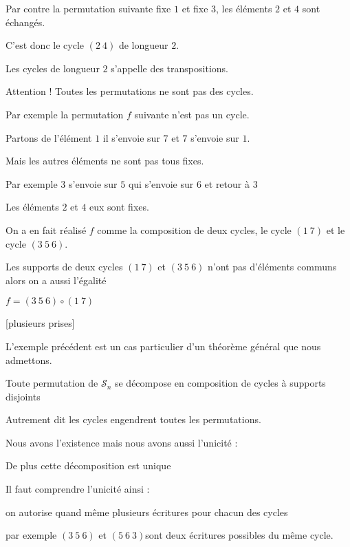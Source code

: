 \change

Par contre la permutation suivante 
fixe $1$ et fixe $3$, les éléments $2$ et $4$ sont échangés.

C'est donc le cycle $(2\ 4)$ de longueur $2$.

Les cycles de longueur $2$ s'appelle des transpositions.

\change

Attention ! Toutes les permutations ne sont pas des cycles. 

Par exemple la permutation $f$ suivante n'est pas un cycle.

Partons de l'élément $1$ il s'envoie sur $7$ et $7$ s'envoie sur $1$.

Mais les autres éléments ne sont pas tous fixes.

Par exemple $3$ s'envoie sur $5$  qui s'envoie sur $6$ et retour à $3$

Les éléments $2$ et $4$ eux sont fixes.

\change

On a en fait réalisé $f$ comme la composition de deux cycles, le cycle $(1\ 7)$ et le cycle $(3\ 5\ 6)$.



\change

Les supports de deux cycles $(1\ 7)$ et $(3\ 5\ 6)$ n'ont pas d'éléments communs
alors on a aussi l'égalité

$f = (3\ 5\ 6) \circ (1\ 7)$  

\diapo

[plusieurs prises]

L'exemple précédent est un cas particulier d'un théorème général que nous admettons.

Toute permutation de $\mathcal{S}_n$ se décompose en composition
de cycles à supports disjoints

Autrement dit les cycles engendrent toutes les permutations.


\change

Nous avons l'existence mais nous avons aussi l'unicité :
 
De plus cette décomposition est unique

\change

Il faut comprendre l'unicité ainsi :

on autorise quand même plusieurs écritures pour chacun des cycles

 par exemple $(3\ 5\ 6)$ et $(5\ 6\ 3)$sont deux écritures possibles du même cycle.

